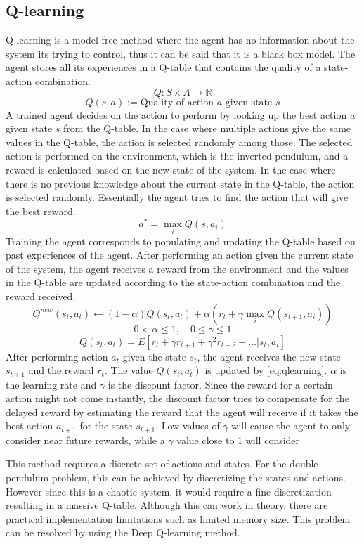 \documentclass{LTHtwocol} %
\begin{document}
\subsection{Q-learning}
Q-learning is a model free method where the agent has no information about the system its trying to control, thus it can be said that it is a black box model.
The agent stores all its experiences in a Q-table that contains the quality of a state-action combination.
\[ Q : S \times A  \to \mathbb{R} \]
\[Q(s,a) := \text{Quality of action $a$ given state  $s$} \]
A trained agent decides on the action to perform by looking up the best action $a$ given state $s$ from the Q-table.
In the case where multiple actions give the same values in the Q-table, the action is selected randomly among those.
The selected action is performed on the environment, which is the inverted pendulum, and a reward is calculated based on the new state of the system.
In the case where there is no previous knowledge about the current state in the Q-table, the action is selected randomly.
Essentially the agent tries to find the action that will give the best reward.
\[ a^* = \max_i Q(s,a_i) \]
Training the agent corresponds to populating and updating the Q-table based on past experiences of the agent.
After performing an action given the current state of the system, the agent receives a reward from the environment and the values in the Q-table are updated according to the state-action combination and the reward received.
\begin{equation}
Q^{new}(s_t,a_t) \leftarrow (1 - \alpha)Q(s_t,a_t) + \alpha (r_t + \gamma \max_i Q(s_{t+1},a_i ))
\label{eq:qlearning}
\end{equation}
\[ 0 < \alpha \leq 1, \quad 0 \leq \gamma \leq 1  \]
\[ Q(s_t,a_t) = E[r_t + \gamma r_{t+1} + \gamma^2 r_{t+2} + \hdots | s_t,a_t] \]
After performing action $a_t$ given the state $s_t$, the agent receives the new state $s_{t+1}$ and the reward $r_t$. The value $Q(s_t,a_t)$ is updated by \eqref{eq:qlearning}. $\alpha$ is the learning rate and $\gamma$ is the discount factor. Since the reward for a certain action might not come instantly, the discount factor tries to compensate for the delayed reward by estimating the reward that the agent will receive if it takes the best action $a_{t+1}$ for the state $s_{t+1}$. Low values of $\gamma$ will cause the agent to only consider near future rewards, while a $\gamma$ value close to 1 will consider

This method requires a discrete set of actions and states. For the double pendulum problem, this can be achieved by discretizing the states and actions.
However since this is a chaotic system, it would require a fine discretization resulting in a massive Q-table. Although this can work in theory, there are practical implementation limitations such as limited memory size.
This problem can be resolved by using the Deep Q-learning method.
\end{document}
